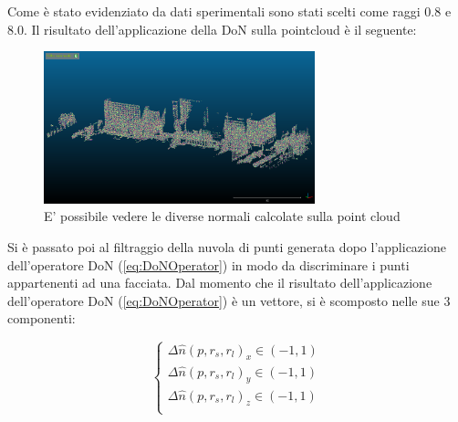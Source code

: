 Come è stato evidenziato da dati sperimentali \cite{don} sono stati scelti come raggi 0.8 e 8.0. \newline
Il risultato dell'applicazione della DoN sulla pointcloud è il seguente: 

\begin{figure}[H]
    \centering
    \includegraphics[width=0.7\textwidth]{Immagini/DoN.png}
    \caption{E' possibile vedere le diverse normali calcolate sulla point cloud}
    \label{fig:DoN}
\end{figure}

Si è passato poi al filtraggio della nuvola di punti generata dopo l'applicazione dell'operatore DoN (\ref{eq:DoNOperator}) in modo da discriminare i punti appartenenti ad una facciata. \newline
Dal momento che il risultato dell'applicazione dell'operatore DoN (\ref{eq:DoNOperator}) è un vettore, si è scomposto nelle sue 3 componenti:

\begin{equation}
    \begin{cases}
    \Delta\hat{n}(p,r_s,r_l)_x \in (-1, 1) \\
    \Delta\hat{n}(p,r_s,r_l)_y \in (-1, 1) \\
    \Delta\hat{n}(p,r_s,r_l)_z \in (-1, 1) \\
    \end{cases}
\end{equation}{}


